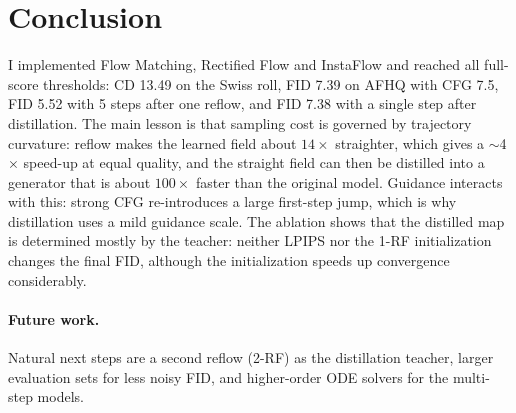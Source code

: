 \section{Conclusion}
\label{sec:conclusion}

I implemented Flow Matching, Rectified Flow and InstaFlow and reached all full-score thresholds: CD 13.49 on the Swiss roll, FID 7.39 on AFHQ with CFG 7.5, FID 5.52 with 5 steps after one reflow, and FID 7.38 with a single step after distillation.
The main lesson is that sampling cost is governed by trajectory curvature: reflow makes the learned field about $14\times$ straighter, which gives a $\sim$4$\times$ speed-up at equal quality, and the straight field can then be distilled into a generator that is about $100\times$ faster than the original model.
Guidance interacts with this: strong CFG re-introduces a large first-step jump, which is why distillation uses a mild guidance scale.
The ablation shows that the distilled map is determined mostly by the teacher: neither LPIPS nor the 1-RF initialization changes the final FID, although the initialization speeds up convergence considerably.

\paragraph{Future work.}
Natural next steps are a second reflow (2-RF) as the distillation teacher, larger evaluation sets for less noisy FID, and higher-order ODE solvers for the multi-step models.

